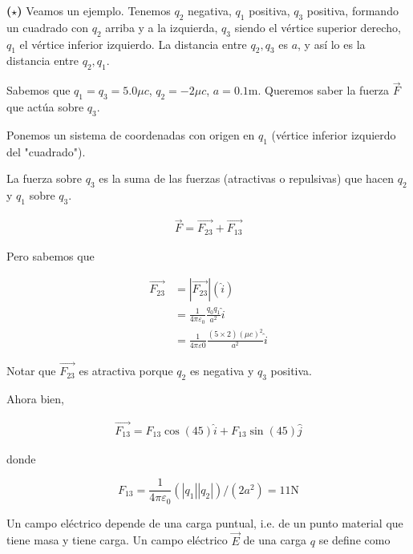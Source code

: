 \documentclass[12pt]{article}
\theoremstyle{definition}
\begin{document}
\begin{shaded}
    \textbf{($\star$)} Veamos un ejemplo. Tenemos $q_2$ negativa, $q_1$
    positiva, $q_3$ positiva, formando un cuadrado con $q_2$ arriba y a la
    izquierda, $q_3$ siendo el vértice superior derecho, $q_1$ el vértice
    inferior izquierdo. La distancia entre $q_2, q_3$ es $a$, y así lo es 
    la distancia entre $q_2, q_1$. 

    Sabemos que $q_1 = q_3 = 5.0\mu c$, $q_2 = -2\mu c$, $a = 0.1\text{m}$.
    Queremos saber la fuerza $\vec{F}$ que actúa sobre $q_3$.

    Ponemos un sistema de coordenadas con origen en $q_1$ (vértice inferior
    izquierdo del "cuadrado"). 

    La fuerza sobre $q_3$ es la suma de las fuerzas (atractivas o repulsivas)
    que hacen $q_2$ y $q_1$ sobre $q_3$.

    \begin{align*}
        \vec{F} = \vec{F_{23}} + \vec{F_{13}}
    \end{align*}

    Pero sabemos que 

    \begin{align*}
        \vec{F_{23}} 
        &= \left| \vec{F_{23}} \right| (\hat{i}) \\ 
        &= \frac{1}{4\pi \varepsilon_0} \frac{q_0q_1}{a^2}  \hat{i} \\ 
        &= \frac{1}{4\pi \varepsilon 0} \frac{( 5 \times  2 ) (\mu c)^2 }{a^2}
        \hat{i}
    \end{align*}

    Notar que $\vec{F_{23}}$ es atractiva porque $q_2$ es negativa y $q_3$
    positiva.

    Ahora bien, 

    \begin{align*}
        \vec{F_{13}} = F_{13} \cos(45) \hat{i} + F_{13} \sin(45) \hat{j}
    \end{align*}

    donde 

    \begin{equation*}
        F_{13} = \frac{1}{4\pi \varepsilon_0} (\left| q_1 \right|\left| q_2
        \right|  ) / (2a^2) = 11\text{N}
    \end{equation*}
\end{shaded}

Un campo eléctrico depende de una carga puntual, i.e. de un punto material que
tiene masa y tiene carga. Un campo eléctrico $\vec{E}$ de una carga $q$ se
define como 
\end{document}
